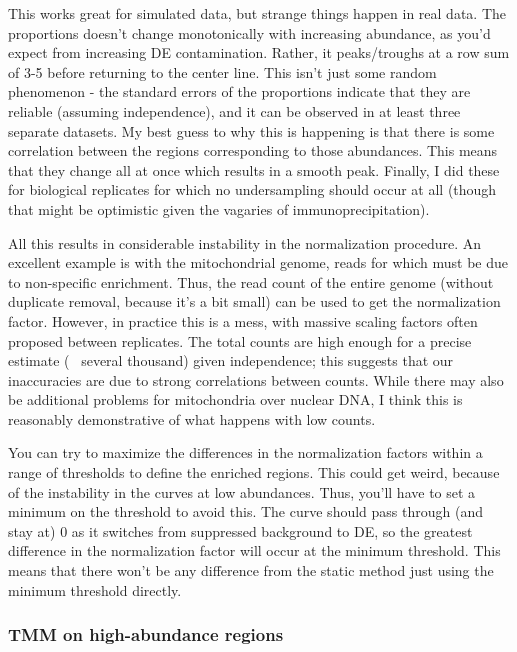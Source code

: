 \documentclass[12pt]{report}
\begin{document}
\begin{itemize}
This works great for simulated data, but strange things happen in real data. 
The proportions doesn't change monotonically with increasing abundance, as you'd expect from increasing DE contamination. 
Rather, it peaks/troughs at a row sum of 3-5 before returning to the center line. 
This isn't just some random phenomenon - the standard errors of the proportions indicate that they are reliable (assuming independence), and it can be observed in at least three separate datasets. 
My best guess to why this is happening is that there is some correlation between the regions corresponding to those abundances.
This means that they change all at once which results in a smooth peak. 
Finally, I did these for biological replicates for which no undersampling should occur at all (though that might be optimistic given the vagaries of immunoprecipitation). 

All this results in considerable instability in the normalization procedure. 
An excellent example is with the mitochondrial genome, reads for which must be due to non-specific enrichment. 
Thus, the read count of the entire genome (without duplicate removal, because it's a bit small) can be used to get the normalization factor. 
However, in practice this is a mess, with massive scaling factors often proposed between replicates.  
The total counts are high enough for a precise estimate (~ several thousand) given independence; this suggests that our inaccuracies are due to strong correlations between counts.
While there may also be additional problems for mitochondria over nuclear DNA, I think this is reasonably demonstrative of what happens with low counts.

You can try to maximize the differences in the normalization factors within a range of thresholds to define the enriched regions.
This could get weird, because of the instability in the curves at low abundances.
Thus, you'll have to set a minimum on the threshold to avoid this.
The curve should pass through (and stay at) 0 as it switches from suppressed background to DE, so the greatest difference in the normalization factor will occur at the minimum threshold.
This means that there won't be any difference from the static method just using the minimum threshold directly.
\end{itemize}

\subsubsection*{TMM on high-abundance regions}
\end{document}
